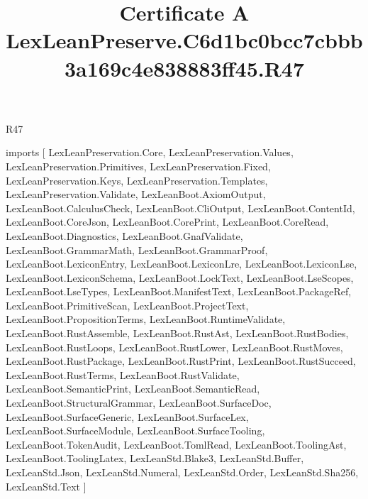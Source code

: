 \begin{lexlean}{R47}
\title{Certificate A LexLeanPreserve.C6d1bc0bcc7cbbb3a169c4e838883ff45.R47}
\begin{coremodule}
imports [
  LexLeanPreservation.Core,
  LexLeanPreservation.Values,
  LexLeanPreservation.Primitives,
  LexLeanPreservation.Fixed,
  LexLeanPreservation.Keys,
  LexLeanPreservation.Templates,
  LexLeanPreservation.Validate,
  LexLeanBoot.AxiomOutput,
  LexLeanBoot.CalculusCheck,
  LexLeanBoot.CliOutput,
  LexLeanBoot.ContentId,
  LexLeanBoot.CoreJson,
  LexLeanBoot.CorePrint,
  LexLeanBoot.CoreRead,
  LexLeanBoot.Diagnostics,
  LexLeanBoot.GnafValidate,
  LexLeanBoot.GrammarMath,
  LexLeanBoot.GrammarProof,
  LexLeanBoot.LexiconEntry,
  LexLeanBoot.LexiconLre,
  LexLeanBoot.LexiconLse,
  LexLeanBoot.LexiconSchema,
  LexLeanBoot.LockText,
  LexLeanBoot.LseScopes,
  LexLeanBoot.LseTypes,
  LexLeanBoot.ManifestText,
  LexLeanBoot.PackageRef,
  LexLeanBoot.PrimitiveScan,
  LexLeanBoot.ProjectText,
  LexLeanBoot.PropositionTerms,
  LexLeanBoot.RuntimeValidate,
  LexLeanBoot.RustAssemble,
  LexLeanBoot.RustAst,
  LexLeanBoot.RustBodies,
  LexLeanBoot.RustLoops,
  LexLeanBoot.RustLower,
  LexLeanBoot.RustMoves,
  LexLeanBoot.RustPackage,
  LexLeanBoot.RustPrint,
  LexLeanBoot.RustSucceed,
  LexLeanBoot.RustTerms,
  LexLeanBoot.RustValidate,
  LexLeanBoot.SemanticPrint,
  LexLeanBoot.SemanticRead,
  LexLeanBoot.StructuralGrammar,
  LexLeanBoot.SurfaceDoc,
  LexLeanBoot.SurfaceGeneric,
  LexLeanBoot.SurfaceLex,
  LexLeanBoot.SurfaceModule,
  LexLeanBoot.SurfaceTooling,
  LexLeanBoot.TokenAudit,
  LexLeanBoot.TomlRead,
  LexLeanBoot.ToolingAst,
  LexLeanBoot.ToolingLatex,
  LexLeanStd.Blake3,
  LexLeanStd.Buffer,
  LexLeanStd.Json,
  LexLeanStd.Numeral,
  LexLeanStd.Order,
  LexLeanStd.Sha256,
  LexLeanStd.Text
]


\end{coremodule}
\end{lexlean}
